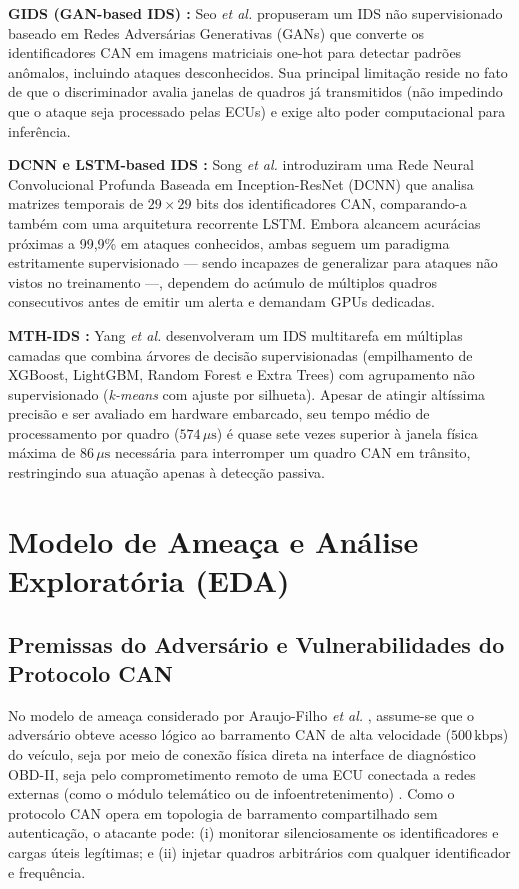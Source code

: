 \documentclass[conference]{IEEEtran}
\begin{document}
\textbf{GIDS (GAN-based IDS) \cite{seo2018gids}:} Seo \textit{et al.} propuseram um IDS não supervisionado baseado em Redes Adversárias Generativas (GANs) que converte os identificadores CAN em imagens matriciais one-hot para detectar padrões anômalos, incluindo ataques desconhecidos. Sua principal limitação reside no fato de que o discriminador avalia janelas de quadros já transmitidos (não impedindo que o ataque seja processado pelas ECUs) e exige alto poder computacional para inferência.

\textbf{DCNN e LSTM-based IDS \cite{song2020invehicle}:} Song \textit{et al.} introduziram uma Rede Neural Convolucional Profunda Baseada em Inception-ResNet (DCNN) que analisa matrizes temporais de $29 \times 29$ bits dos identificadores CAN, comparando-a também com uma arquitetura recorrente LSTM. Embora alcancem acurácias próximas a 99,9\% em ataques conhecidos, ambas seguem um paradigma estritamente supervisionado — sendo incapazes de generalizar para ataques não vistos no treinamento —, dependem do acúmulo de múltiplos quadros consecutivos antes de emitir um alerta e demandam GPUs dedicadas.

\textbf{MTH-IDS \cite{yang2021mth}:} Yang \textit{et al.} desenvolveram um IDS multitarefa em múltiplas camadas que combina árvores de decisão supervisionadas (empilhamento de XGBoost, LightGBM, Random Forest e Extra Trees) com agrupamento não supervisionado (\textit{k-means} com ajuste por silhueta). Apesar de atingir altíssima precisão e ser avaliado em hardware embarcado, seu tempo médio de processamento por quadro ($574\,\mu\text{s}$) é quase sete vezes superior à janela física máxima de $86\,\mu\text{s}$ necessária para interromper um quadro CAN em trânsito, restringindo sua atuação apenas à detecção passiva.

\section{Modelo de Ameaça e Análise Exploratória (EDA)}

\subsection{Premissas do Adversário e Vulnerabilidades do Protocolo CAN}
No modelo de ameaça considerado por Araujo-Filho \textit{et al.} \cite{araujo2021efficient}, assume-se que o adversário obteve acesso lógico ao barramento CAN de alta velocidade ($500\,\text{kbps}$) do veículo, seja por meio de conexão física direta na interface de diagnóstico OBD-II, seja pelo comprometimento remoto de uma ECU conectada a redes externas (como o módulo telemático ou de infoentretenimento) \cite{miller2015remote}. Como o protocolo CAN opera em topologia de barramento compartilhado sem autenticação, o atacante pode: (i) monitorar silenciosamente os identificadores e cargas úteis legítimas; e (ii) injetar quadros arbitrários com qualquer identificador e frequência.
\end{document}
